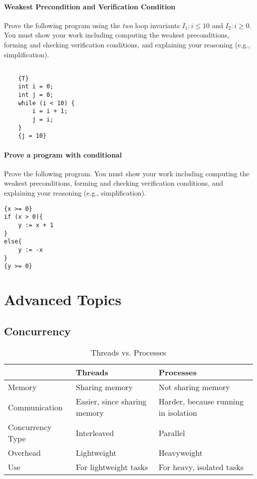 \documentclass[oneside,11pt,dvipsnames]{book}
\begin{document}
\subsection{Weakest Precondition and Verification Condition}\label{exercise:wp-vc}

Prove the following program using the \emph{two} loop invariants $I_1: i \le 10$ and $I_2: i \ge 0$.  You must show your work including computing the weakest preconditions, forming and checking verification conditions, and explaining your reasoning (e.g., simplification). 

\begin{lstlisting}

    {T}
    int i = 0;
    int j = 0;
    while (i < 10) {
        i = i + 1;
        j = i;
    }
    {j = 10}

\end{lstlisting}    


\subsection{Prove a program with conditional}\label{exercise:conditional}

Prove the following program. You must show your work including computing the weakest preconditions, forming and checking verification conditions, and explaining your reasoning (e.g., simplification).

\begin{lstlisting}
{x >= 0}
if (x > 0){
    y := x + 1
}
else{
    y := -x
}
{y >= 0}
\end{lstlisting}




\part{Advanced Topics}
\chapter{Concurrency}\label{chapter:concurrency}


\begin{table}
    \caption{Threads vs. Processes}\label{tab:threads-vs-processes}
    \small
    \centering
    \begin{tabular}{l|l|l}
    \toprule
    &\textbf{Threads} & \textbf{Processes} \\
    \midrule
    Memory & Sharing memory & Not sharing memory\\
    Communication & Easier, since sharing memory & Harder, because running in isolation \\
    Concurrency Type & Interleaved & Parallel \\
    Overhead & Lightweight & Heavyweight\\
    Use & For lightweight tasks & For heavy, isolated tasks \\
    \bottomrule
    \end{tabular}
\end{table}
\end{document}

